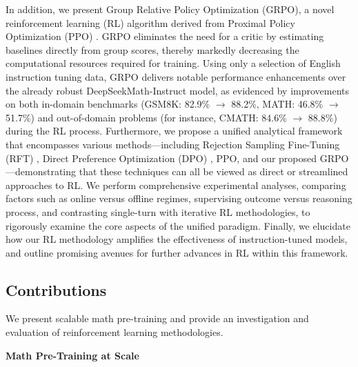 In addition, we present Group Relative Policy Optimization (GRPO), a novel reinforcement learning (RL) algorithm derived from Proximal Policy Optimization (PPO) \citep{schulman2017proximal}. GRPO eliminates the need for a critic by estimating baselines directly from group scores, thereby markedly decreasing the computational resources required for training. Using only a selection of English instruction tuning data, GRPO delivers notable performance enhancements over the already robust DeepSeekMath-Instruct model, as evidenced by improvements on both in-domain benchmarks (GSM8K: 82.9\% $\rightarrow$ 88.2\%, MATH: 46.8\% $\rightarrow$ 51.7\%) and out-of-domain problems (for instance, CMATH: 84.6\% $\rightarrow$ 88.8\%) during the RL process. Furthermore, we propose a unified analytical framework that encompasses various methods—including Rejection Sampling Fine-Tuning (RFT) \citep{yuan2023scaling}, Direct Preference Optimization (DPO) \citep{dpo}, PPO, and our proposed GRPO—demonstrating that these techniques can all be viewed as direct or streamlined approaches to RL. We perform comprehensive experimental analyses, comparing factors such as online versus offline regimes, supervising outcome versus reasoning process, and contrasting single-turn with iterative RL methodologies, to rigorously examine the core aspects of the unified paradigm. Finally, we elucidate how our RL methodology amplifies the effectiveness of instruction-tuned models, and outline promising avenues for further advances in RL within this framework.

\subsection{Contributions}
We present scalable math pre-training and provide an investigation and evaluation of reinforcement learning methodologies.

\textbf{Math Pre-Training at Scale}

